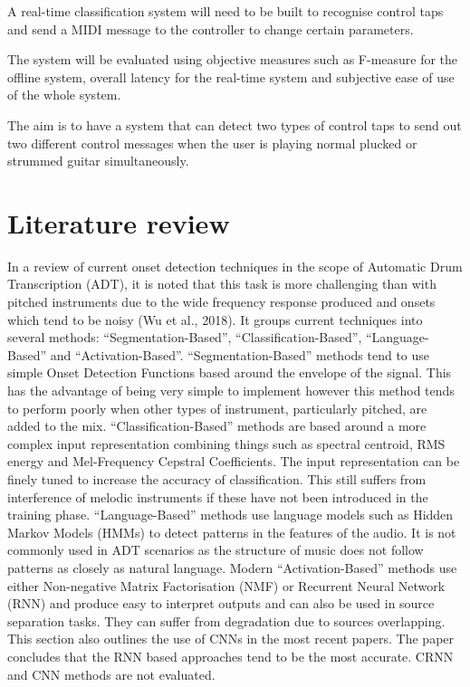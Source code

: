\documentclass[conference]{IEEEtran}
\begin{document}
A real-time classification system will need to be built to recognise control taps and send a MIDI message to the controller to change certain parameters.

The system will be evaluated using objective measures such as F-measure for the offline system, overall latency for the real-time system and subjective ease of use of the whole system.

The aim is to have a system that can detect two types of control taps to send out two different control messages when the user is playing normal plucked or strummed guitar simultaneously.

\section{Literature review}
In a review of current onset detection techniques in the scope of Automatic Drum Transcription (ADT), it is noted that this task is more challenging than with pitched instruments
due to the wide frequency response produced and onsets which tend to be noisy (Wu et al., 2018). It groups current techniques into several methods: ``Segmentation-Based'', ``Classification-Based'', ``Language-Based''
and ``Activation-Based''. ``Segmentation-Based'' methods tend to use simple Onset Detection Functions based around the envelope of the signal. This has the advantage of being very simple
to implement however this method tends to perform poorly when other types of instrument, particularly pitched, are added to the mix. ``Classification-Based'' methods are based around
a more complex input representation combining things such as spectral centroid, RMS energy and Mel-Frequency Cepstral Coefficients. The input representation can be finely tuned to increase
the accuracy of classification. This still suffers from interference of melodic instruments if these have not been introduced in the training phase. ``Language-Based'' methods use language
models such as Hidden Markov Models (HMMs) to detect patterns in the features of the audio. It is not commonly used in ADT scenarios as the structure of music does not follow patterns
as closely as natural language. Modern ``Activation-Based'' methods use either Non-negative Matrix Factorisation (NMF) or Recurrent Neural Network (RNN) and produce easy to interpret
outputs and can also be used in source separation tasks. They can suffer from degradation due to sources overlapping. This section also outlines the use of CNNs in the most recent papers. 
The paper concludes that the RNN based approaches tend to be the most accurate. CRNN and CNN methods are not evaluated. 
\end{document}
